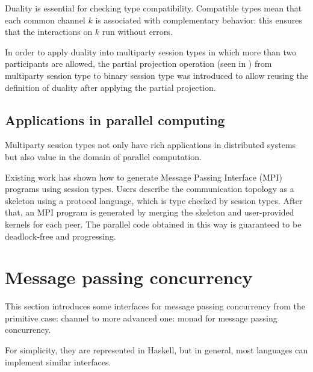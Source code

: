 Duality is essential for checking type compatibility. Compatible types mean that each common channel $k$ is associated with complementary behavior: this ensures that the interactions on $k$ run without errors. 

In order to apply duality into multiparty session types in which more than two participants are allowed, the partial projection operation (seen in \cite{coppoGentleIntroductionMultiparty2015}) from multiparty session type to binary session type was introduced to allow reusing the definition of duality after applying the partial projection.
\subsection{Applications in parallel computing} \label{b:mpst:app}
Multiparty session types not only have rich applications in distributed systems but also value in the domain of parallel computation. 

Existing work\cite{ngProtocolsDefault2015} has shown how to generate Message Passing Interface (MPI) \cite{MessagePassingInterface} programs using session types. Users describe the communication topology as a skeleton using a protocol language, which is type checked by session types. After that, an MPI program is generated by merging the skeleton and user-provided kernels for each peer. The parallel code obtained in this way is guaranteed to be deadlock-free and progressing. 

\section{Message passing concurrency} \label{b:mo}
This section introduces some interfaces for message passing concurrency from the primitive case: channel to more advanced one: monad for message passing concurrency.

For simplicity, they are represented in Haskell, but in general, most languages can implement similar interfaces. 
